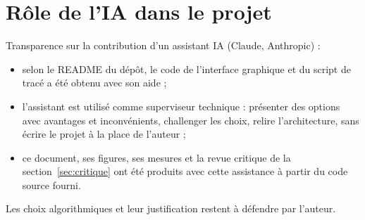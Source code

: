 \documentclass[11pt,a4paper]{article}
\begin{document}
\section{Rôle de l'IA dans le projet}
\label{sec:ia}
Transparence sur la contribution d'un assistant IA (Claude, Anthropic) :
\begin{itemize}
\item selon le README du dépôt, le code de l'interface graphique et du script de tracé a été obtenu avec son aide ;
\item l'assistant est utilisé comme superviseur technique : présenter des options avec avantages et inconvénients,
challenger les choix, relire l'architecture, sans écrire le projet à la place de l'auteur ;
\item ce document, ses figures, ses mesures et la revue critique de la section~\ref{sec:critique} ont été produits avec cette assistance
à partir du code source fourni.
\end{itemize}
Les choix algorithmiques et leur justification restent à défendre par l'auteur.

\appendix
\end{document}
